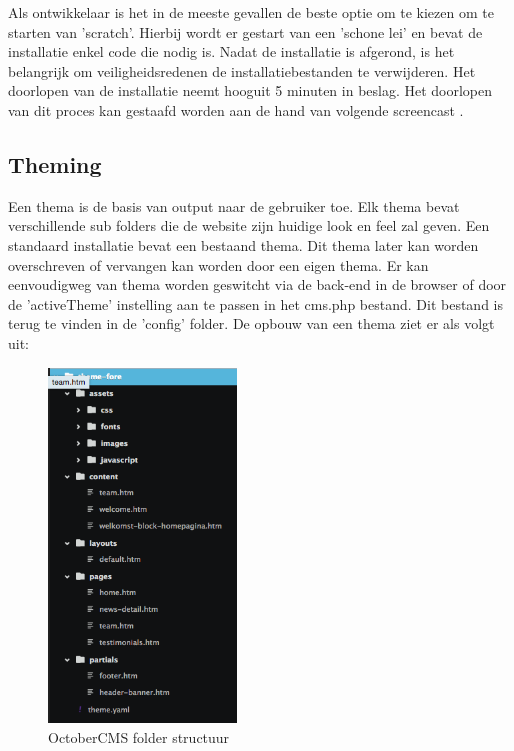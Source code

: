 \noindent
Als ontwikkelaar is het in de meeste gevallen de beste optie om te kiezen om te starten van 'scratch'. Hierbij wordt er gestart van een 'schone lei' en bevat de installatie enkel code die nodig is. 
\newline\newline
Nadat de installatie is afgerond, is het belangrijk om veiligheidsredenen de installatiebestanden te verwijderen. 
\newline\newline
Het doorlopen van de installatie neemt hooguit 5 minuten in beslag. Het doorlopen van dit proces kan gestaafd worden aan de hand van volgende screencast \citep{LearnTogether2016InstallXAMPP}.


\subsection{Theming}
Een thema is de basis van output naar de gebruiker toe. Elk thema bevat verschillende sub folders die de website zijn huidige look en feel zal geven. Een standaard installatie bevat een bestaand thema. Dit thema later kan worden overschreven of vervangen kan worden door een eigen thema. Er kan eenvoudigweg van thema worden geswitcht via de back-end in de browser of door de 'activeTheme' instelling aan te passen in het cms.php bestand. Dit bestand is terug te vinden in de 'config' folder. De opbouw van een thema ziet er als volgt uit:

\begin{figure}[!ht]
  \includegraphics[width=50mm]{img/folder-structure.png}
  \centering
  \caption{OctoberCMS folder structuur}
  \label{fig:OctoberCMS folder structuur}
\end{figure}

